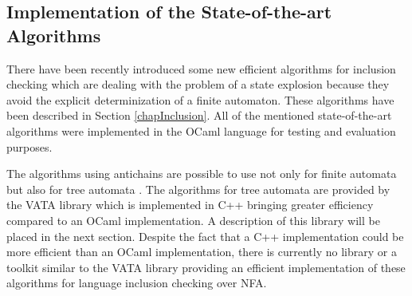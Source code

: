 \subsection{Implementation of the State-of-the-art Algorithms}
There have been recently introduced some new efficient algorithms for inclusion checking 
which are dealing with the problem of a state explosion because they avoid the explicit determinization of a finite automaton. These 
algorithms have been described in Section \ref{chapInclusion}.
All of the mentioned state-of-the-art algorithms were implemented in the OCaml language for testing and evaluation purposes.

The algorithms using antichains are possible to use not only for finite automata but also for tree automata \cite{cav06,tacas10}. 
The algorithms for tree automata are provided by the VATA library which is implemented in C++ bringing greater efficiency compared to an OCaml implementation. 
A description of this library will be placed in the next section.
Despite the fact that a C++ implementation could be more efficient than an OCaml implementation, there is currently 
no library or a toolkit similar to the VATA library providing an efficient implementation of these algorithms for language inclusion checking over NFA.

